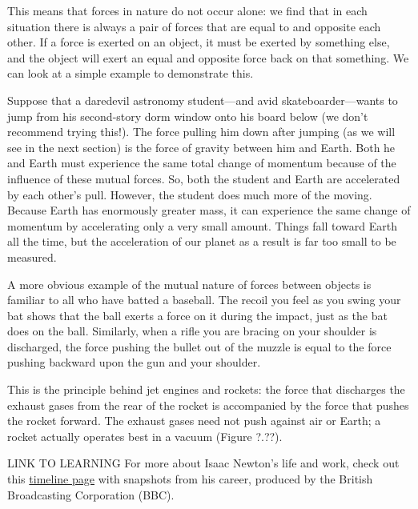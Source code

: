 \documentclass[../../main-astronomy.tex]{subfiles}
\begin{document}
\vspace{1em}

This means that forces in nature do not occur alone: we find that in each situation there is always a pair of forces that are equal to and opposite each other. If a force is exerted on an object, it must be exerted by something else, and the object will exert an equal and opposite force back on that something. We can look at a simple example to demonstrate this.

\vspace{1em}

Suppose that a daredevil astronomy student---and avid skateboarder---wants to jump from his second-story dorm window onto his board below (we don’t recommend trying this!). The force pulling him down after jumping (as we will see in the next section) is the force of gravity between him and Earth. Both he and Earth must experience the same total change of momentum because of the influence of these mutual forces. So, both the student and Earth are accelerated by each other’s pull. However, the student does much more of the moving. Because Earth has enormously greater mass, it can experience the same change of momentum by accelerating only a very small amount. Things fall toward Earth all the time, but the acceleration of our planet as a result is far too small to be measured.

\vspace{1em}

A more obvious example of the mutual nature of forces between objects is familiar to all who have batted a baseball. The recoil you feel as you swing your bat shows that the ball exerts a force on it during the impact, just as the bat does on the ball. Similarly, when a rifle you are bracing on your shoulder is discharged, the force pushing the bullet out of the muzzle is equal to the force pushing backward upon the gun and your shoulder.

\vspace{1em}

This is the principle behind jet engines and rockets: the force that discharges the exhaust gases from the rear of the rocket is accompanied by the force that pushes the rocket forward. The exhaust gases need not push against air or Earth; a rocket actually operates best in a vacuum (Figure ?.??).

\begin{gradient}{LINK TO LEARNING}
    For more about Isaac Newton’s life and work, check out this \href{https://openstax.org/l/30IsaacNewTime}{timeline page} with snapshots from his career, produced by the British Broadcasting Corporation (BBC).
\end{gradient}
\end{document}

